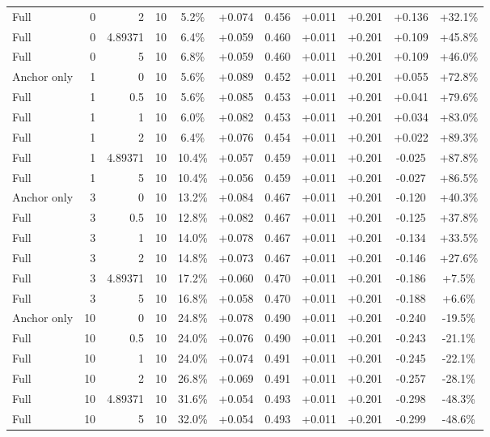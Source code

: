 \begin{table}[htbp]
\begin{tabular}{lrrrccccccc}
Full & 0 & 2 & 10 & 5.2\% & +0.074 & 0.456 & +0.011 & +0.201 & +0.136 & +32.1\% \\
Full & 0 & 4.89371 & 10 & 6.4\% & +0.059 & 0.460 & +0.011 & +0.201 & +0.109 & +45.8\% \\
Full & 0 & 5 & 10 & 6.8\% & +0.059 & 0.460 & +0.011 & +0.201 & +0.109 & +46.0\% \\
Anchor only & 1 & 0 & 10 & 5.6\% & +0.089 & 0.452 & +0.011 & +0.201 & +0.055 & +72.8\% \\
Full & 1 & 0.5 & 10 & 5.6\% & +0.085 & 0.453 & +0.011 & +0.201 & +0.041 & +79.6\% \\
Full & 1 & 1 & 10 & 6.0\% & +0.082 & 0.453 & +0.011 & +0.201 & +0.034 & +83.0\% \\
Full & 1 & 2 & 10 & 6.4\% & +0.076 & 0.454 & +0.011 & +0.201 & +0.022 & +89.3\% \\
Full & 1 & 4.89371 & 10 & 10.4\% & +0.057 & 0.459 & +0.011 & +0.201 & -0.025 & +87.8\% \\
Full & 1 & 5 & 10 & 10.4\% & +0.056 & 0.459 & +0.011 & +0.201 & -0.027 & +86.5\% \\
Anchor only & 3 & 0 & 10 & 13.2\% & +0.084 & 0.467 & +0.011 & +0.201 & -0.120 & +40.3\% \\
Full & 3 & 0.5 & 10 & 12.8\% & +0.082 & 0.467 & +0.011 & +0.201 & -0.125 & +37.8\% \\
Full & 3 & 1 & 10 & 14.0\% & +0.078 & 0.467 & +0.011 & +0.201 & -0.134 & +33.5\% \\
Full & 3 & 2 & 10 & 14.8\% & +0.073 & 0.467 & +0.011 & +0.201 & -0.146 & +27.6\% \\
Full & 3 & 4.89371 & 10 & 17.2\% & +0.060 & 0.470 & +0.011 & +0.201 & -0.186 & +7.5\% \\
Full & 3 & 5 & 10 & 16.8\% & +0.058 & 0.470 & +0.011 & +0.201 & -0.188 & +6.6\% \\
Anchor only & 10 & 0 & 10 & 24.8\% & +0.078 & 0.490 & +0.011 & +0.201 & -0.240 & -19.5\% \\
Full & 10 & 0.5 & 10 & 24.0\% & +0.076 & 0.490 & +0.011 & +0.201 & -0.243 & -21.1\% \\
Full & 10 & 1 & 10 & 24.0\% & +0.074 & 0.491 & +0.011 & +0.201 & -0.245 & -22.1\% \\
Full & 10 & 2 & 10 & 26.8\% & +0.069 & 0.491 & +0.011 & +0.201 & -0.257 & -28.1\% \\
Full & 10 & 4.89371 & 10 & 31.6\% & +0.054 & 0.493 & +0.011 & +0.201 & -0.298 & -48.3\% \\
Full & 10 & 5 & 10 & 32.0\% & +0.054 & 0.493 & +0.011 & +0.201 & -0.299 & -48.6\% \\

\end{tabular}
\end{table}
